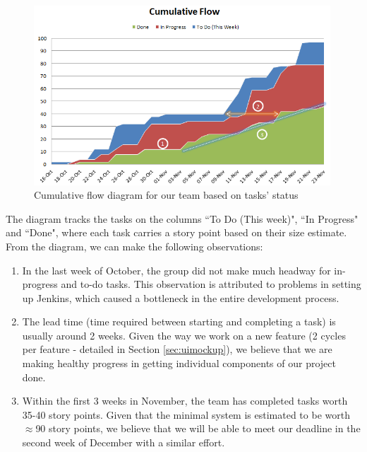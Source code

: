 \documentclass[a4paper, titlepage]{article}
\begin{document}
\begin{figure}[h!]
  \centering
    \includegraphics[width = 0.99\textwidth]{./eval/cumu_flow.png}
  \caption{Cumulative flow diagram for our team based on tasks' status}
  \label{fig:eval_cumuflow}
\end{figure}

The diagram tracks the tasks on the columns ``To Do (This week)", ``In Progress" and ``Done", where each task carries a story point based on their size estimate. From the diagram, we can make the following observations:

\begin{enumerate}

  \item In the last week of October, the group did not make much headway for in-progress and to-do tasks. This observation is attributed to problems in setting up Jenkins, which caused a bottleneck in the entire development process.

  \item The lead time (time required between starting and completing a task) is usually around 2 weeks. Given the way we work on a new feature (2 cycles per feature - detailed in Section \ref{sec:uimockup}), we believe that we are making healthy progress in getting individual components of our project done.

  \item Within the first 3 weeks in November, the team has completed tasks worth 35-40 story points. Given that the minimal system is estimated to be worth $\approx$90 story points, we believe that we will be able to meet our deadline in the second week of December with a similar effort.

\end{enumerate}
\end{document}
